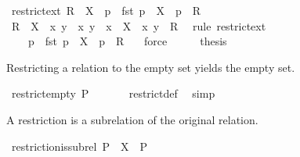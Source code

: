 \begin{isabellebody}
\ restrict{\isacharunderscore}ext{\isacharprime}{\isacharcolon}\ {\isachardoublequoteopen}R\ {\isacharbar}{\isacharbar}\ X\ {\isacharequal}\ {\isacharbraceleft}p\ {\isachardot}\ fst\ p\ {\isasymin}\ X\ {\isasymand}\ p\ {\isasymin}\ R{\isacharbraceright}{\isachardoublequoteclose}\isanewline
%
\isadelimproof
%
\endisadelimproof
%
\isatagproof
{}\isamarkupfalse%
\ {\isacharminus}\isanewline
\ \ \isamarkupfalse%
\ {\isachardoublequoteopen}R\ {\isacharbar}{\isacharbar}\ X\ {\isacharequal}\ {\isacharbraceleft}{\isacharparenleft}x{\isacharcomma}\ y{\isacharparenright}\ {\isacharbar}\ x\ y\ {\isachardot}\ x\ {\isasymin}\ X\ {\isasymand}\ {\isacharparenleft}x{\isacharcomma}\ y{\isacharparenright}\ {\isasymin}\ R{\isacharbraceright}{\isachardoublequoteclose}\ \isamarkupfalse%
\ {\isacharparenleft}rule\ restrict{\isacharunderscore}ext{\isacharparenright}\isanewline
\ \ \isamarkupfalse%
\ \isamarkupfalse%
\ {\isachardoublequoteopen}{\isasymdots}\ {\isacharequal}\ {\isacharbraceleft}\ p\ {\isachardot}\ fst\ p\ {\isasymin}\ X\ {\isasymand}\ p\ {\isasymin}\ R\ {\isacharbraceright}{\isachardoublequoteclose}\ \isamarkupfalse%
\ force\isanewline
\ \ \isamarkupfalse%
\ \isamarkupfalse%
\ {\isacharquery}thesis\ \isacommand{{\isachardot}}\isamarkupfalse%
\isanewline
{}\isamarkupfalse%
%
\endisatagproof
{\isafoldproof}%
%
\isadelimproof
%
\endisadelimproof
%
\begin{isamarkuptext}%
Restricting a relation to the empty set yields the empty set.%
\end{isamarkuptext}%
\isamarkuptrue%
\isamarkupfalse%
\ restrict{\isacharunderscore}empty{\isacharcolon}\ {\isachardoublequoteopen}P\ {\isacharbar}{\isacharbar}\ {\isacharbraceleft}{\isacharbraceright}\ {\isacharequal}\ {\isacharbraceleft}{\isacharbraceright}{\isachardoublequoteclose}%
\isadelimproof
\ %
\endisadelimproof
%
\isatagproof
{}\isamarkupfalse%
\ restrict{\isacharunderscore}def\ \isamarkupfalse%
\ simp%
\endisatagproof
{\isafoldproof}%
%
\isadelimproof
%
\endisadelimproof
%
\begin{isamarkuptext}%
A restriction is a subrelation of the original relation.%
\end{isamarkuptext}%
\isamarkuptrue%
\isamarkupfalse%
\ restriction{\isacharunderscore}is{\isacharunderscore}subrel{\isacharcolon}\ {\isachardoublequoteopen}P\ {\isacharbar}{\isacharbar}\ X\ {\isasymsubseteq}\ P{\isachardoublequoteclose}%

\end{isabellebody}
